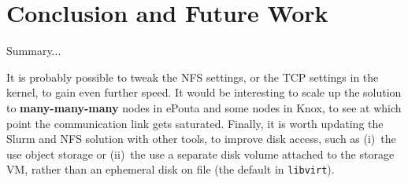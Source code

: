 \section{Conclusion and Future Work}
\label{section:conclusion}

Summary...
\vspace{1cm}

%
It is probably possible to tweak the NFS settings, or the TCP settings
in the kernel, to gain even further speed.
%
It would be interesting to scale up the solution to
\textbf{many-many-many} nodes in ePouta and some nodes in Knox, to see
at which point the communication link gets saturated.
%
Finally, it is worth updating the Slurm and NFS solution with other
tools, to improve disk access, such as (i)~the use object storage or
(ii)~the use a separate disk volume attached to the storage VM, rather
than an ephemeral disk on file (\ie the default in \texttt{libvirt}).

